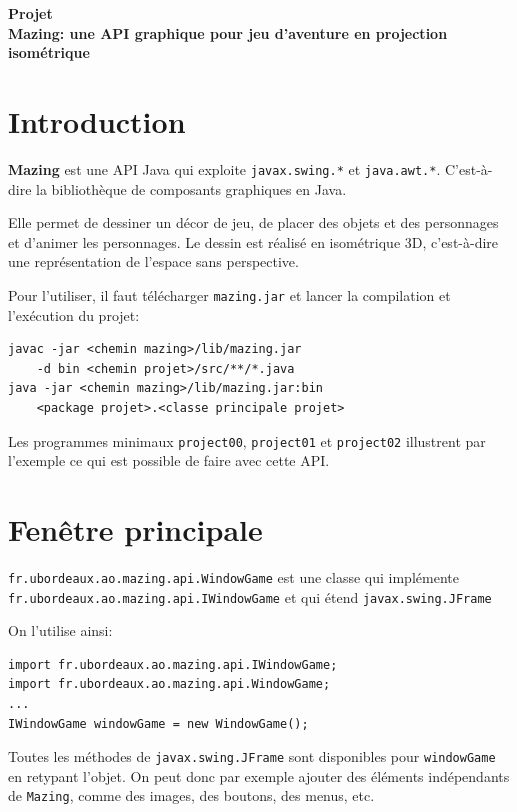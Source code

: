 \documentclass{article}
\newcommand{\bigtext}{\fontsize{16pt}{20pt}\selectfont}
\newcommand{\code}[1]{\lstinline{#1}}
\newcommand{\PROJECTheader}[1]{
    \begin{tcolorbox}[colback=gray!10!white, colframe=gray!80!black, width=\textwidth, sharp corners]
        \centering
        \vspace{0.2cm}
        \textbf{\Large Projet} \\
        \textbf{#1}
    \end{tcolorbox}
}
\begin{document}
\bigtext

\PROJECTheader{Mazing: une API graphique pour jeu d'aventure en projection isométrique}

\section*{Introduction}

\textbf{Mazing} est une API Java qui exploite \code{javax.swing.*} et \code{java.awt.*}. C'est-à-dire 
la bibliothèque de composants graphiques en Java.

Elle permet de dessiner un décor de jeu, de placer des objets et des personnages et d'animer les personnages.
Le dessin est réalisé en isométrique 3D, c'est-à-dire une représentation de l'espace sans perspective.

Pour l'utiliser, il faut télécharger \code{mazing.jar} et lancer la compilation et l'exécution du projet:

\begin{lstlisting}[]
javac -jar <chemin mazing>/lib/mazing.jar 
    -d bin <chemin projet>/src/**/*.java
java -jar <chemin mazing>/lib/mazing.jar:bin 
    <package projet>.<classe principale projet>
\end{lstlisting}

Les programmes minimaux \texttt{project00}, \texttt{project01} et \texttt{project02} illustrent par 
l'exemple ce qui est possible de faire avec cette API.

\section*{Fenêtre principale}

\code{fr.ubordeaux.ao.mazing.api.WindowGame} est une classe qui implémente\\ 
\code{fr.ubordeaux.ao.mazing.api.IWindowGame} et qui étend \code{javax.swing.JFrame}

On l'utilise ainsi:
\begin{lstlisting}[]
import fr.ubordeaux.ao.mazing.api.IWindowGame;
import fr.ubordeaux.ao.mazing.api.WindowGame;
...
IWindowGame windowGame = new WindowGame();
\end{lstlisting}

Toutes les méthodes de \code{javax.swing.JFrame} sont disponibles pour \code{windowGame} en retypant l'objet. 
On peut donc par exemple ajouter des éléments indépendants de \texttt{Mazing}, comme des images, des boutons, des menus, etc.
\end{document}

